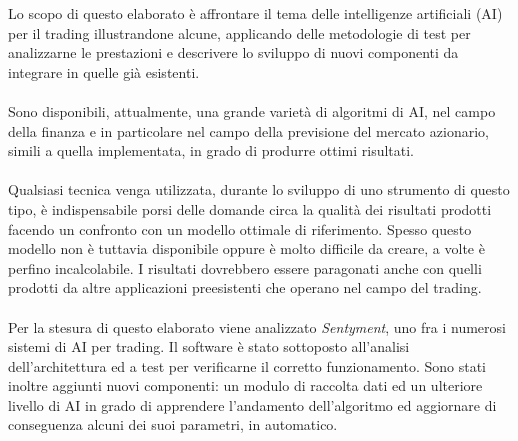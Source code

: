 \documentclass[a4paper,12pt]{report}
\begin{document}
%
% 
% 
%
%
Lo scopo di questo elaborato è affrontare il tema delle intelligenze artificiali (AI) per il trading illustrandone alcune, applicando delle metodologie di test per analizzarne le prestazioni e descrivere lo sviluppo di nuovi componenti da integrare in quelle già esistenti.
\\~\\
Sono disponibili, attualmente, una grande varietà di algoritmi di AI, nel campo della finanza e in particolare nel campo della previsione del mercato azionario, simili a quella implementata, in grado di produrre ottimi risultati.\\~\\Qualsiasi tecnica venga utilizzata, durante lo sviluppo di uno strumento di questo tipo, è indispensabile porsi delle domande circa la qualità dei risultati prodotti facendo un confronto con un modello ottimale di riferimento. Spesso questo modello non è tuttavia disponibile oppure è molto difficile da creare, a volte è perfino incalcolabile. I risultati dovrebbero essere paragonati anche con quelli prodotti da altre applicazioni preesistenti che operano nel campo del trading.\\~\\
Per la stesura di questo elaborato viene analizzato \textit{Sentyment}, uno fra i numerosi sistemi di AI per trading. Il software è stato sottoposto all'analisi dell'architettura ed a test per verificarne il corretto funzionamento. Sono stati inoltre aggiunti nuovi componenti: un modulo di raccolta dati ed un ulteriore livello di AI in grado di apprendere l'andamento dell'algoritmo ed aggiornare di conseguenza alcuni dei suoi parametri, in automatico.
\afterpreface
\end{document}
